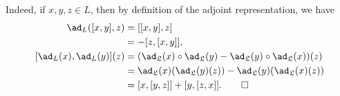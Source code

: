 Indeed, if $x, y, z \in L$, then by definition of the adjoint representation,
we have
\begin{align*}
	\ad_L([x, y], z) &= [[x, y], z]\\
	&= -[z, [x, y]],\\
	[\ad_L(x), \ad_L(y)](z) &= (\ad_{\mathfrak{L}}(x)\circ\ad_{\mathfrak{L}}(y) - \ad_{\mathfrak{L}}(y) \circ \ad_{\mathfrak{L}}(x))(z)\\
		&= \ad_{\mathfrak{L}}(x)(\ad_{\mathfrak{L}}(y)(z)) - \ad_{\mathfrak{L}}(y)(\ad_{\mathfrak{L}}(x)(z))\\
		&=[x, [y, z]] + [y, [z, x]].\qedhere\\
\end{align*}
